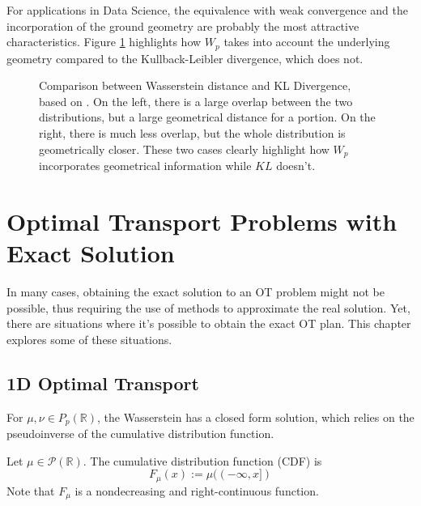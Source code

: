 For applications in Data Science, the equivalence with weak convergence and the
incorporation of the ground geometry are probably the most attractive characteristics.
Figure \ref{fig:wl-kl}
highlights how $W_p$ takes into account the underlying geometry compared
to the Kullback-Leibler divergence, which does not.


\begin{figure}[H]
  \centering
  \def\svgscale{0.7}
  
	\caption{Comparison between Wasserstein distance and KL Divergence, based on \citet{montavon2016boltzmann}.
  On the left,
  there is a large overlap between the two distributions, but a large geometrical distance for a portion. On the right,
  there is much less overlap, but the whole distribution is geometrically closer. These two
  cases clearly highlight how $W_p$ incorporates geometrical information while $KL$ doesn't.}
	\label{fig:wl-kl}
\end{figure}

\newpage
\chapter{Optimal Transport Problems with Exact Solution}

In many cases, obtaining the exact solution to an OT problem might not be possible,
thus requiring the use of methods to approximate the real solution. Yet,
there are situations where it's possible to obtain the exact OT plan. This chapter
explores some of these situations.

\section{1D Optimal Transport}

\label{sec:1dOT}
For $\mu,\nu \in P_p(\mathbb R)$, the Wasserstein has a closed form solution, which
relies on the pseudoinverse of the cumulative distribution function.
\begin{definition}
  Let $\mu \in \mathcal P(\mathbb R)$. The cumulative distribution function (CDF) is
  \begin{equation}
    F_\mu(x) := \mu((-\infty,x])
  \end{equation}
  Note that $F_\mu$ is a nondecreasing and right-continuous function.
  \label{def:cumulativefunction}
\end{definition}

